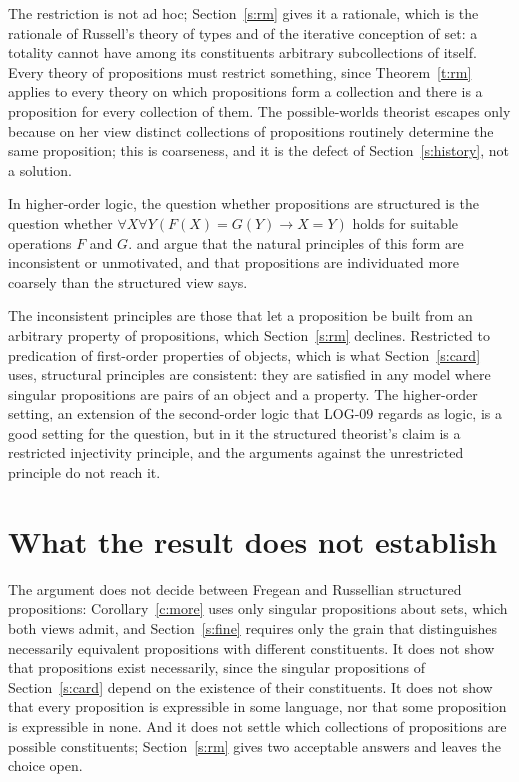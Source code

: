 \documentclass{situationist-preprint}
\begin{document}
\begin{reply}
The restriction is not ad hoc; Section~\ref{s:rm} gives it a rationale, which is the rationale of Russell's theory of types and of the iterative conception of set: a totality cannot have among its constituents arbitrary subcollections of itself. Every theory of propositions must restrict something, since Theorem~\ref{t:rm} applies to every theory on which propositions form a collection and there is a proposition for every collection of them. The possible-worlds theorist escapes only because on her view distinct collections of propositions routinely determine the same proposition; this is coarseness, and it is the defect of Section~\ref{s:history}, not a solution.
\end{reply}

\begin{objection}\label{o:ho}
In higher-order logic, the question whether propositions are structured is the question whether $\forall X \forall Y (F(X) = G(Y) \to X = Y)$ holds for suitable operations $F$ and $G$. \citet{Dorr2016} and \citet{Goodman2017} argue that the natural principles of this form are inconsistent or unmotivated, and that propositions are individuated more coarsely than the structured view says.
\end{objection}

\begin{reply}
The inconsistent principles are those that let a proposition be built from an arbitrary property of propositions, which Section~\ref{s:rm} declines. Restricted to predication of first-order properties of objects, which is what Section~\ref{s:card} uses, structural principles are consistent: they are satisfied in any model where singular propositions are pairs of an object and a property. The higher-order setting, an extension of the second-order logic that LOG-09 regards as logic, is a good setting for the question, but in it the structured theorist's claim is a restricted injectivity principle, and the arguments against the unrestricted principle do not reach it.
\end{reply}

\section{What the result does not establish}\label{s:not}

The argument does not decide between Fregean and Russellian structured propositions: Corollary~\ref{c:more} uses only singular propositions about sets, which both views admit, and Section~\ref{s:fine} requires only the grain that distinguishes necessarily equivalent propositions with different constituents. It does not show that propositions exist necessarily, since the singular propositions of Section~\ref{s:card} depend on the existence of their constituents. It does not show that every proposition is expressible in some language, nor that some proposition is expressible in none. And it does not settle which collections of propositions are possible constituents; Section~\ref{s:rm} gives two acceptable answers and leaves the choice open.
\end{document}
